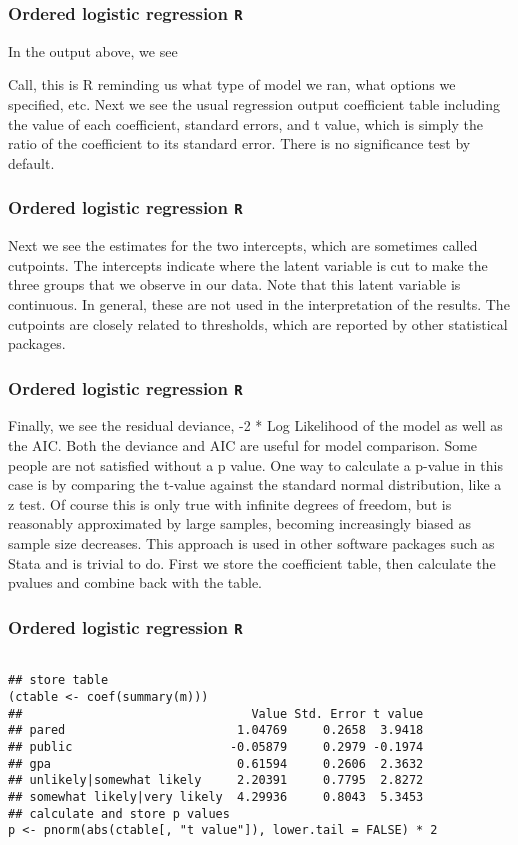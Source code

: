 \documentclass[00-GLMregslides.tex]{subfiles}
\begin{document}
\begin{frame}[fragile]
	\frametitle{Ordered logistic regression \texttt{R} }
	\Large
In the output above, we see

Call, this is R reminding us what type of model we ran, what options we specified, etc.
Next we see the usual regression output coefficient table including the value of each coefficient, standard errors, and t value, which is simply the ratio of the coefficient to its standard error. There is no significance test by default.
\end{frame}
\begin{frame}[fragile]
	\frametitle{Ordered logistic regression \texttt{R} }
	\Large
	
Next we see the estimates for the two intercepts, which are sometimes called cutpoints. The intercepts indicate where the latent variable is cut to make the three groups that we observe in our data. Note that this latent variable is continuous. In general, these are not used in the interpretation of the results. The cutpoints are closely related to thresholds, which are reported by other statistical packages.
\end{frame}
\begin{frame}[fragile]
	\frametitle{Ordered logistic regression \texttt{R} }
	\Large
Finally, we see the residual deviance, -2 * Log Likelihood of the model as well as the AIC. Both the deviance and AIC are useful for model comparison.
Some people are not satisfied without a p value. One way to calculate a p-value in this case is by comparing the t-value against the standard normal distribution, like a z test. Of course this is only true with infinite degrees of freedom, but is reasonably approximated by large samples, becoming increasingly biased as sample size decreases. This approach is used in other software packages such as Stata and is trivial to do. First we store the coefficient table, then calculate the pvalues and combine back with the table.
\end{frame}
\begin{frame}[fragile]
	\frametitle{Ordered logistic regression \texttt{R} }
	\Large
\begin{framed}		
	\begin{verbatim}
		
## store table
(ctable <- coef(summary(m)))
##                                Value Std. Error t value
## pared                        1.04769     0.2658  3.9418
## public                      -0.05879     0.2979 -0.1974
## gpa                          0.61594     0.2606  2.3632
## unlikely|somewhat likely     2.20391     0.7795  2.8272
## somewhat likely|very likely  4.29936     0.8043  5.3453
## calculate and store p values
p <- pnorm(abs(ctable[, "t value"]), lower.tail = FALSE) * 2
\end{verbatim}
\end{framed}
\end{frame}
\end{document}
